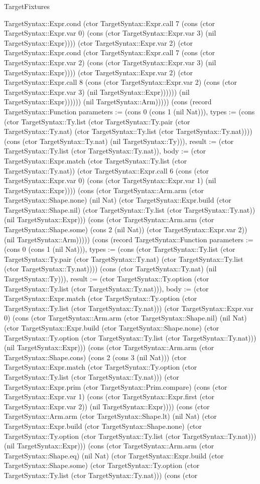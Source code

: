 \begin{lexlean}{TargetFixtures}
\begin{semanticmodule}
{TargetSyntax::Expr.cond (ctor TargetSyntax::Expr.call 7 (cons (ctor TargetSyntax::Expr.var 0) (cons (ctor TargetSyntax::Expr.var 3) (nil TargetSyntax::Expr)))) (ctor TargetSyntax::Expr.var 2) (ctor TargetSyntax::Expr.cond (ctor TargetSyntax::Expr.call 7 (cons (ctor TargetSyntax::Expr.var 2) (cons (ctor TargetSyntax::Expr.var 3) (nil TargetSyntax::Expr)))) (ctor TargetSyntax::Expr.var 2) (ctor TargetSyntax::Expr.call 8 (cons (ctor TargetSyntax::Expr.var 2) (cons (ctor TargetSyntax::Expr.var 3) (nil TargetSyntax::Expr)))))) (nil TargetSyntax::Expr)))))) (nil TargetSyntax::Arm))))}) (cons (record TargetSyntax::Function {parameters := (cons 0 (cons 1 (nil Nat))), types := (cons (ctor TargetSyntax::Ty.list (ctor TargetSyntax::Ty.pair (ctor TargetSyntax::Ty.nat) (ctor TargetSyntax::Ty.list (ctor TargetSyntax::Ty.nat)))) (cons (ctor TargetSyntax::Ty.nat) (nil TargetSyntax::Ty))), result := (ctor TargetSyntax::Ty.list (ctor TargetSyntax::Ty.nat)), body := (ctor TargetSyntax::Expr.match (ctor TargetSyntax::Ty.list (ctor TargetSyntax::Ty.nat)) (ctor TargetSyntax::Expr.call 6 (cons (ctor TargetSyntax::Expr.var 0) (cons (ctor TargetSyntax::Expr.var 1) (nil TargetSyntax::Expr)))) (cons (ctor TargetSyntax::Arm.arm (ctor TargetSyntax::Shape.none) (nil Nat) (ctor TargetSyntax::Expr.build (ctor TargetSyntax::Shape.nil) (ctor TargetSyntax::Ty.list (ctor TargetSyntax::Ty.nat)) (nil TargetSyntax::Expr))) (cons (ctor TargetSyntax::Arm.arm (ctor TargetSyntax::Shape.some) (cons 2 (nil Nat)) (ctor TargetSyntax::Expr.var 2)) (nil TargetSyntax::Arm))))}) (cons (record TargetSyntax::Function {parameters := (cons 0 (cons 1 (nil Nat))), types := (cons (ctor TargetSyntax::Ty.list (ctor TargetSyntax::Ty.pair (ctor TargetSyntax::Ty.nat) (ctor TargetSyntax::Ty.list (ctor TargetSyntax::Ty.nat)))) (cons (ctor TargetSyntax::Ty.nat) (nil TargetSyntax::Ty))), result := (ctor TargetSyntax::Ty.option (ctor TargetSyntax::Ty.list (ctor TargetSyntax::Ty.nat))), body := (ctor TargetSyntax::Expr.match (ctor TargetSyntax::Ty.option (ctor TargetSyntax::Ty.list (ctor TargetSyntax::Ty.nat))) (ctor TargetSyntax::Expr.var 0) (cons (ctor TargetSyntax::Arm.arm (ctor TargetSyntax::Shape.nil) (nil Nat) (ctor TargetSyntax::Expr.build (ctor TargetSyntax::Shape.none) (ctor TargetSyntax::Ty.option (ctor TargetSyntax::Ty.list (ctor TargetSyntax::Ty.nat))) (nil TargetSyntax::Expr))) (cons (ctor TargetSyntax::Arm.arm (ctor TargetSyntax::Shape.cons) (cons 2 (cons 3 (nil Nat))) (ctor TargetSyntax::Expr.match (ctor TargetSyntax::Ty.option (ctor TargetSyntax::Ty.list (ctor TargetSyntax::Ty.nat))) (ctor TargetSyntax::Expr.prim (ctor TargetSyntax::Prim.compare) (cons (ctor TargetSyntax::Expr.var 1) (cons (ctor TargetSyntax::Expr.first (ctor TargetSyntax::Expr.var 2)) (nil TargetSyntax::Expr)))) (cons (ctor TargetSyntax::Arm.arm (ctor TargetSyntax::Shape.lt) (nil Nat) (ctor TargetSyntax::Expr.build (ctor TargetSyntax::Shape.none) (ctor TargetSyntax::Ty.option (ctor TargetSyntax::Ty.list (ctor TargetSyntax::Ty.nat))) (nil TargetSyntax::Expr))) (cons (ctor TargetSyntax::Arm.arm (ctor TargetSyntax::Shape.eq) (nil Nat) (ctor TargetSyntax::Expr.build (ctor TargetSyntax::Shape.some) (ctor TargetSyntax::Ty.option (ctor TargetSyntax::Ty.list (ctor TargetSyntax::Ty.nat))) (cons (ctor }
\end{semanticmodule}
\end{lexlean}
